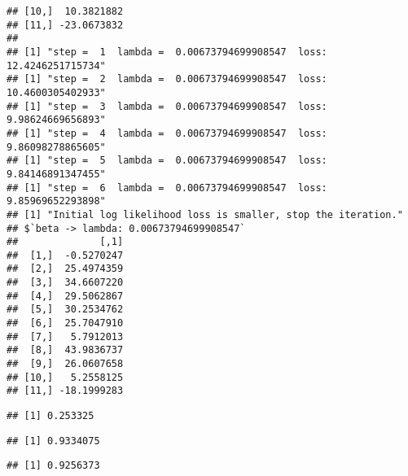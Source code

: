 \documentclass[
]{article}
\newenvironment{Shaded}{\begin{snugshade}}{\end{snugshade}}
\newcommand{\FunctionTok}[1]{\textcolor[rgb]{0.13,0.29,0.53}{\textbf{#1}}}
\newcommand{\NormalTok}[1]{#1}
\newcommand{\OtherTok}[1]{\textcolor[rgb]{0.56,0.35,0.01}{#1}}
\newcommand{\SpecialCharTok}[1]{\textcolor[rgb]{0.81,0.36,0.00}{\textbf{#1}}}
\begin{document}
\begin{verbatim}
## [10,]  10.3821882
## [11,] -23.0673832
## 
## [1] "step =  1  lambda =  0.00673794699908547  loss:  12.4246251715734"
## [1] "step =  2  lambda =  0.00673794699908547  loss:  10.4600305402933"
## [1] "step =  3  lambda =  0.00673794699908547  loss:  9.98624669656893"
## [1] "step =  4  lambda =  0.00673794699908547  loss:  9.86098278865605"
## [1] "step =  5  lambda =  0.00673794699908547  loss:  9.84146891347455"
## [1] "step =  6  lambda =  0.00673794699908547  loss:  9.85969652293898"
## [1] "Initial log likelihood loss is smaller, stop the iteration."
## $`beta -> lambda: 0.00673794699908547`
##              [,1]
##  [1,]  -0.5270247
##  [2,]  25.4974359
##  [3,]  34.6607220
##  [4,]  29.5062867
##  [5,]  30.2534762
##  [6,]  25.7047910
##  [7,]   5.7912013
##  [8,]  43.9836737
##  [9,]  26.0607658
## [10,]   5.2558125
## [11,] -18.1999283
\end{verbatim}

\begin{Shaded}
\end{Shaded}

\begin{verbatim}
## [1] 0.253325
\end{verbatim}

\begin{Shaded}
\end{Shaded}

\begin{verbatim}
## [1] 0.9334075
\end{verbatim}

\begin{Shaded}
\end{Shaded}

\begin{verbatim}
## [1] 0.9256373
\end{verbatim}
\end{document}
